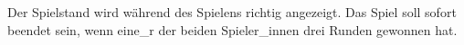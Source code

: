 Der Spielstand wird während des Spielens richtig angezeigt. Das Spiel soll sofort beendet sein,
wenn eine\_r der beiden Spieler\_innen drei Runden gewonnen hat.